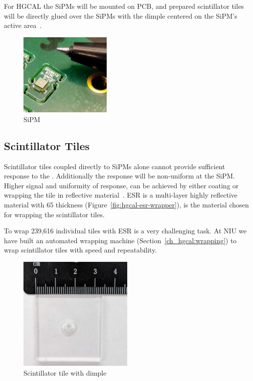 For \gls{HGCAL} the \glspl{SiPM} will be mounted on \gls{PCB},
and prepared scintillator tiles will be directly glued
over the \glspl{SiPM} with the dimple centered on the \gls{SiPM}'s active area~\cite{Zutshi2012}.

\begin{figure}[!ht]
  \centering
  \includegraphics[width=0.4\textwidth]{figures/hgcal/sipm.jpg}
  \caption[SiPM]{SiPM}%
  \label{fig:hgcal-sipm}
\end{figure}

\subsection{
  Scintillator Tiles
}\label{ch_hgcal:scint-tiles}

Scintillator tiles coupled directly to \glspl{SiPM} alone cannot provide
sufficient response to the .
Additionally
the response will be non-uniform at the \gls{SiPM}. Higher
signal and uniformity of response, can be achieved by either coating or wrapping the tile in reflective
material~\cite{niu-sipm-on-tile}. \gls{ESR}
is a multi-layer highly reflective material with 65\micron{} thickness (Figure~\ref{fig:hgcal-esr-wrapper}), is the material chosen for wrapping the scintillator tiles.

To wrap 239,616 individual tiles  with \gls{ESR} is a very challenging task.
At NIU we have built an automated wrapping machine (Section~\ref{ch_hgcal:wrapping}) to
wrap scintillator tiles with speed and repeatability.

\begin{figure}[!ht]
  \centering
  \includegraphics[width=0.5\textwidth]{figures/hgcal/tile_19.jpg}
  \caption[Scintillator tile with dimple]{Scintillator tile with dimple}%
  \label{fig:hgcal-scintillator-tile}
\end{figure}


